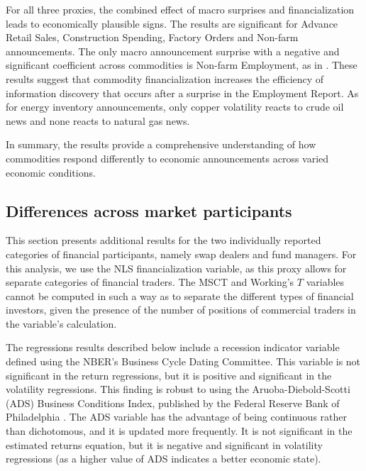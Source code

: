 
For all three proxies, the combined effect of macro surprises and financialization leads to economically plausible signs. The results are significant for Advance Retail Sales, Construction Spending, Factory Orders and Non-farm announcements. The only macro announcement surprise with a negative and significant coefficient across commodities is Non-farm Employment, as in \citet{hordahl2020expectations}. These results suggest that commodity financialization increases the efficiency of information discovery that occurs after a surprise in the Employment Report. As for energy inventory announcements, only copper volatility  reacts to crude oil news and none reacts to natural gas news.
%


In summary, the results provide a comprehensive understanding of how commodities respond differently to economic announcements across varied economic conditions.


\subsection{Differences across market participants}


 This section presents additional results for the two individually reported categories of financial participants, namely swap dealers and fund managers. For this analysis, we use the NLS financialization variable, as this proxy allows for separate categories of financial traders. 
The MSCT and Working's $T$ variables cannot be computed in such a way as to separate the different types of financial investors, given the presence of the number of positions of commercial traders in the variable's calculation.



 The regressions results described below include a recession indicator variable defined using the NBER's Business Cycle Dating Committee. This variable is not significant in the return regressions, but it is positive and significant in the volatility regressions. This finding is robust to using the Aruoba-Diebold-Scotti (ADS) Business Conditions Index, published by the Federal Reserve Bank of Philadelphia \citep*{doi:10.1198/jbes.2009.07205}. The ADS variable has the advantage of being continuous rather than dichotomous, and it  is updated more frequently. It is not significant in the estimated returns equation, but it is negative and significant in volatility regressions (as a higher value of ADS indicates a better economic state).


